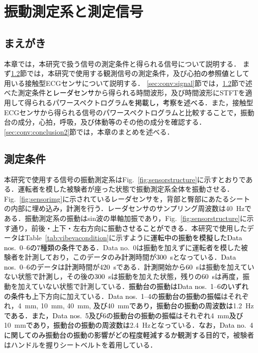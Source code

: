 \chapter{振動測定系と測定信号}
\label{chap:measurementstructsig}

\section{まえがき}
本章では，本研究で扱う信号の測定条件と得られる信号について説明する．
{まず\ref{sec:conv:measurementcondition}節では，本研究で使用する観測信号の測定条件，及び心拍\textcolor{black}{の参照値}として用いる接触型ECGセンサについて説明する．
\ref{sec:conv:signal}節では，\ref{sec:conv:measurementcondition}節で述べた測定条件\textcolor{black}{とレーダセンサ}から得られる時間波形，及び時間波形にSTFTを適用して得られるパワースペクトログラム\textcolor{black}{を掲載し，考察を述べる}．また，接触型ECGセンサから得られる信号のパワースペクトログラムと比較することで\textcolor{black}{，}振動台の成分，心拍，呼吸，及び体動等のその他の成分を確認する．
\ref{sec:conv:conclusion2}節では，本章のまとめを述べる．}

\section{測定条件}
\label{sec:conv:measurementcondition}
		本研究で使用する信号の{振動測定系}はFig.~\ref{fig:sensorstructure}に示すとおりである．{運転者を模した}被験者が座った状態で{振動測定系}全体を振動させる．Fig.~\ref{fig:sensorimg}に示されている{レーダセンサ}を，{背部と臀部にあたるシートの内部に埋め込み}，\textcolor{black}{計測}を行う．レーダセンサのサンプリング周波数は40~Hzである．{振動測定系の振動はsin波の単軸加振であり，Fig.~\ref{fig:sensorstructure}に示す通り，前後・上下・左右方向に振動\textcolor{black}{させることができる}．本研究で使用したデータはTable~\ref{tab:vibevacondition}に示すように\textcolor{black}{運転中の振動を模擬したData nos.~0--6の7種類の条件である}．Data no.~0は振動を加えずに運転者を模した被験者を計測しており，このデータのみ\textcolor{black}{計測}時間が\textcolor{black}{300~s}となっている．\textcolor{black}{Data nos.~0--6}のデータは\textcolor{black}{計測}時間が\textcolor{black}{420~s}である．\textcolor{black}{計測}開始から\textcolor{black}{60~s}は振動を加えていない状態で\textcolor{black}{計測}し，その後の\textcolor{black}{300~s}は振動を加えた状態，残りの\textcolor{black}{60~s}は再度，振動を加えていない状態で計測している．\textcolor{black}{振動台の振動はData nos.~1--6のいずれの条件も}上下方向に加えている．\textcolor{black}{Data nos.~1--4}の\textcolor{black}{振動台の振動の振幅}はそれぞれ，4~mm, 10~mm, 40~mm, \textcolor{black}{及び}40~mm\textcolor{black}{であり，振動台の振動の周波数は}1.2~Hz\textcolor{black}{である．また，Data nos.~5及び6}の\textcolor{black}{振動台の振動の振幅}はそれぞれ4~mm\textcolor{black}{及び}10~mm\textcolor{black}{であり，振動台の振動の周波数は}2.4~Hzとなっている．\textcolor{black}{なお}，\textcolor{black}{Data no.~4に関してのみ振動台の振動}の\textcolor{black}{影響がどの程度軽減するか観測する目的で，}被験者はハンドルを握りシートベルトを着用している．}

